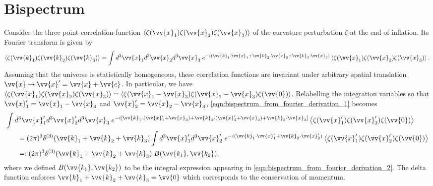 \documentclass[a4paper,12pt,times,custombib,print,index]{Classes/PhDThesisPSnPDF} %
\providecommand{\DIFadd}[1]{{\protect\color{blue}\uwave{#1}}} %
\providecommand{\DIFdel}[1]{{\protect\color{red}\sout{#1}}}                      %
\providecommand{\DIFaddbegin}{} %
\providecommand{\DIFaddend}{} %
\providecommand{\DIFdelbegin}{} %
\providecommand{\DIFdelend}{} %
\newcommand{\DIFscaledelfig}{0.5}
\newlength{\DIFdelgraphicswidth} %
\newlength{\DIFdelgraphicsheight} %
\newcommand{\DIFaddincludegraphics}[2][]{{\color{blue}\fbox{\DIFOincludegraphics[#1]{#2}}}} %
\newcommand{\DIFdelincludegraphics}[2][]{%
\sbox{\DIFdelgraphicsbox}{\DIFOincludegraphics[#1]{#2}}%
\settoboxwidth{\DIFdelgraphicswidth}{\DIFdelgraphicsbox} %
\settoboxtotalheight{\DIFdelgraphicsheight}{\DIFdelgraphicsbox} %
\scalebox{\DIFscaledelfig}{%
\parbox[b]{\DIFdelgraphicswidth}{\usebox{\DIFdelgraphicsbox}\\[-\baselineskip] \rule{\DIFdelgraphicswidth}{0em}}\llap{\resizebox{\DIFdelgraphicswidth}{\DIFdelgraphicsheight}{%
\setlength{\unitlength}{\DIFdelgraphicswidth}%
\begin{picture}(1,1)%
\thicklines\linethickness{2pt} %
{\color[rgb]{1,0,0}\put(0,0){\framebox(1,1){}}}%
{\color[rgb]{1,0,0}\put(0,0){\line( 1,1){1}}}%
{\color[rgb]{1,0,0}\put(0,1){\line(1,-1){1}}}%
\end{picture}%
}\hspace*{3pt}}} %
} %
\DeclareRobustCommand{\DIFaddbegin}{\DIFOaddbegin \let\includegraphics\DIFaddincludegraphics} %
\DeclareRobustCommand{\DIFaddend}{\DIFOaddend \let\includegraphics\DIFOincludegraphics} %
\DeclareRobustCommand{\DIFdelbegin}{\DIFOdelbegin \let\includegraphics\DIFdelincludegraphics} %
\DeclareRobustCommand{\DIFdelend}{\DIFOaddend \let\includegraphics\DIFOincludegraphics} %
\begin{document}
\section{Bispectrum} \label{section:bispectrum}

Consider the three-point correlation function $\left< \zeta(\vv{x}_1) \zeta(\vv{x}_2) \zeta(\vv{x}_3) \right>$  of the curvature perturbation $\zeta$ at the end of inflation. Its Fourier transform is given by
\begin{align}
	\left< \zeta(\vv{k}_1) \zeta(\vv{k}_2) \zeta(\vv{k}_3) \right> = \int d^3\vv{x}_1 d^3\vv{x}_2 d^3\vv{x}_3 \; e^{-i(\vv{k}_1 \cdot \vv{x}_1 + \vv{k}_2 \cdot \vv{x}_2 + \vv{k}_3 \cdot \vv{x}_3 )} \left< \zeta(\vv{x}_1) \zeta(\vv{x}_2) \zeta(\vv{x}_3) \right>. \label{eqn:bispectrum_from_fourier_derivation_1}
\end{align}
Assuming that the universe is statistically homogeneous, these correlation functions are invariant under arbitrary spatial translation \DIFdelbegin \DIFdel{$\vv{x} \rightarrow \vv{x}' = \vv{x} + \vv{c}$}\DIFdelend \DIFaddbegin \DIFadd{$\vv{x} \rightarrow \tilde{\vv{x}} = \vv{x} + \vv{c}$}\DIFaddend . In particular, we have \\${\left< \zeta(\vv{x}_1) \zeta(\vv{x}_2) \zeta(\vv{x}_3) \right> = \left< \zeta(\vv{x}_1 - \vv{x}_3) \zeta(\vv{x}_2 - \vv{x}_3) \zeta(\vv{0}) \right>}$. Relabelling the integration variables so that $\vv{x}'_1=\vv{x}_1-\vv{x}_3$ and $\vv{x}'_2=\vv{x}_2-\vv{x}_3$, \eqref{eqn:bispectrum_from_fourier_derivation_1} becomes
\begin{align}
	&\int d^3\vv{x}'_1 d^3\vv{x}'_2 d^3\vv{x}_3 \; e^{-i[ \vv{k}_1 \cdot (\vv{x}'_1 + \vv{x}_3) + \vv{k}_2 \cdot (\vv{x}'_2 + \vv{x}_3) + \vv{k}_3 \cdot \vv{x}_3 ]} \left< \zeta(\vv{x}'_1) \zeta(\vv{x}'_2) \zeta(\vv{0}) \right> \nonumber \\
	&\hspace{0.05\textwidth} = (2\pi)^3 \delta^{(3)}(\vv{k}_1 + \vv{k}_2 + \vv{k}_3) \int d^3\vv{x}'_1 d^3\vv{x}'_2 \; e^{-i( \vv{k}_1 \cdot \vv{x}'_1 + \vv{k}_2 \cdot \vv{x}'_2)} \left< \zeta(\vv{x}'_1) \zeta(\vv{x}'_2) \zeta(\vv{0}) \right> \label{eqn:bispectrum_from_fourier_derivation_2}\\
	&\hspace{0.05\textwidth} =: (2\pi)^3 \delta^{(3)}(\vv{k}_1 + \vv{k}_2 + \vv{k}_3) \; B(\vv{k_1}, \vv{k_2}), \label{eqn:bispectrum_from_fourier_derivation_3}
\end{align}
where we defined $B(\vv{k_1}, \vv{k_2})$ to be the integral expression appearing in \eqref{eqn:bispectrum_from_fourier_derivation_2}. The delta function enforces $\vv{k}_1 + \vv{k}_2 + \vv{k}_3 = \vv{0}$ which corresponds to the conservation of momentum.
\end{document}
